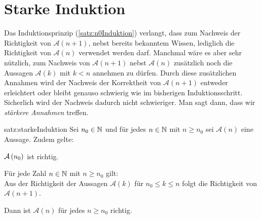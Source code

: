 \section{Starke Induktion}
Das Induktionsprinzip (\cref{satz:n0Induktion}) verlangt, dass zum Nachweis der Richtigkeit von $\mathcal{A}(n+1)$, nebst bereits bekanntem Wissen, lediglich die Richtigkeit von $\mathcal{A}(n)$ verwendet werden darf. Manchmal wäre es aber sehr nützlich, zum Nachweis von $\mathcal{A}(n+1)$ nebst $\mathcal{A}(n)$ zusätzlich noch die Aussagen $\mathcal{A}(k)$ mit $k<n$ annehmen zu dürfen. Durch diese zusätzlichen Annahmen wird der Nachweis der Korrektheit von $\mathcal{A}(n+1)$ entweder erleichtert oder bleibt genauso schwierig wie im bisherigen Induktionsschritt. Sicherlich wird der Nachweis dadurch nicht schwieriger. Man sagt dann, dass wir \textit{stärkere Annahmen} treffen.

\begin{satz}{satz:starkeInduktion}
Sei $n_0\in\mathbb{N}$ und für jedes $n\in\mathbb{N}$ mit $n\geq n_0$ sei $\mathcal{A}(n)$ eine Aussage. Zudem gelte:
\begin{renum}
    \item $\mathcal{A}\left(n_0\right)$ ist richtig.
    \item Für jede Zahl $n\in\mathbb{N}$ mit $n\geq n_0$ gilt:\\
    Aus der Richtigkeit der Aussagen $\mathcal{A}(k)$ für $n_0\leq k\leq n$ folgt die Richtigkeit von $\mathcal{A}(n+1)$.
\end{renum}
Dann ist $\mathcal{A}(n)$ für jedes $n\geq n_0$ richtig.
\end{satz}


